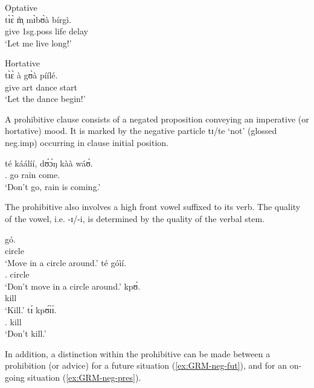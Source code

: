 \ea\label{ex:GRM-hortative}
 
\ea\label{ex:GRM-hortative-vp11.3}{\rm Optative}\\
\gll tɪ̀ɛ̀ m̩̀ mɪ̀bʊ̀à bírgì.\\
    give {\sc 1sg.poss} life delay\\
\glt  `Let me live long!' 

\ex\label{ex:GRM-hortativ-vp11.4}{\rm Hortative}\\
\gll tɪ̀ɛ̀ à gʊ̀à píílé.\\
  give {\sc art} dance start\\
\glt  `Let the dance begin!'

\z 
 \z

A prohibitive clause consists of  a negated proposition conveying an imperative 
(or hortative) mood. It is marked by the negative particle {\sls tɪ}/{\sls te} 
`not'   (glossed {\sc neg.imp}) occurring in clause initial position.


\ea\label{GRM-neg-imp-vp15.10.}
\gll té káálíí, dʊ́ɔ́ŋ kàà wáʊ̀.\\
  {\neg.\imp} go rain {\ipfv} come.{\foc}\\
\glt  `Don't go, rain is coming.' 
\z
 
The prohibitive also involves a high front vowel  suffixed to its verb. The 
quality of the vowel, i.e. {\sls -ɪ}/{\sls -i}, is determined by the quality of 
the verbal stem.

\begin{multicols}{2}
\ea\label{ex:GRM-neg-imperative}
\ea 
\gll gó.\\
circle\\
\glt  `Move in a circle around.'
\ex 
\gll  té   góìí.\\
{\neg.\imp} circle\\
\glt  `Don't move in a circle around.'
\columnbreak
\ex  
\gll kpʊ́.\\
kill\\
\glt `Kill.'
\ex
\gll tɪ́ kpʊ́ɪ̀ɪ́.\\
{\neg.\imp} kill\\
\glt `Don't kill.'
\z 

 \z
 \end{multicols}

In addition, a distinction within the prohibitive can be made
between a prohibition (or advice) for a future situation  
(\ref{ex:GRM-neg-fut}), 
and  for an on-going situation (\ref{ex:GRM-neg-pres}). 


